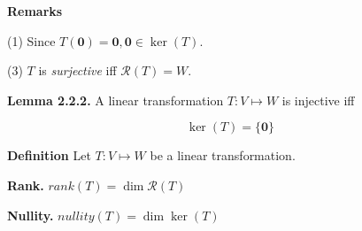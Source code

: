 \documentclass[10pt,landscape]{article}
\begin{document}
\begin{multicols}{4}

\textbf{Remarks}

(1) Since $T(\mathbf{0}) = \mathbf{0}, \mathbf{0} \in \ker (T)$.


(3) $T$ is \textit{surjective} iff $\mathcal{R}(T) = W$.









\textbf{Lemma 2.2.2.} A linear transformation $T : V \mapsto W$ is injective iff

$$
\ker(T) = \{ \mathbf{0} \}
$$


\textbf{Definition} Let $T : V \mapsto W$ be a linear transformation. 

\textbf{Rank.} $rank(T) = \dim \mathcal{R} (T)$

\textbf{Nullity.} $nullity(T) = \dim \ker (T)$





\end{multicols}
\end{document}
